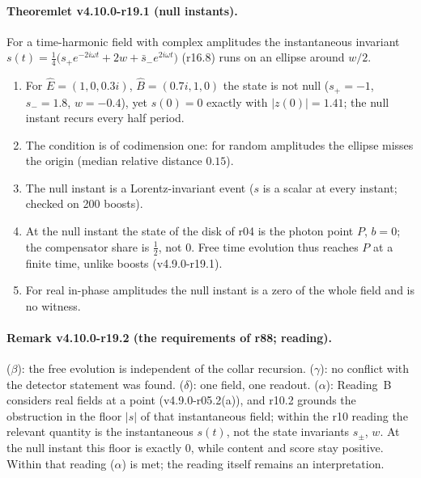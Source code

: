 \paragraph{Theoremlet v4.10.0-r19.1 (null instants).}
For a time-harmonic field with complex amplitudes the instantaneous invariant \(s(t)=\tfrac14\bigl(s_+e^{-2i\omega t}+2w+\bar s_-e^{2i\omega t}\bigr)\)
(r16.8) runs on an ellipse around \(w/2\).
\begin{enumerate}[leftmargin=2em]
\item[(a)] For \(\hat E=(1,0,0.3i)\), \(\hat B=(0.7i,1,0)\) the state is not null (\(s_+=-1\), \(s_-=1.8\), \(w=-0.4\)), yet \(s(0)=0\) exactly with
\(|z(0)|=1.41\); the null instant recurs every half period.
\item[(b)] The condition is of codimension one: for random amplitudes the ellipse misses the origin (median relative distance \(0.15\)).
\item[(c)] The null instant is a Lorentz-invariant event (\(s\) is a scalar at every instant; checked on 200 boosts).
\item[(d)] At the null instant the state of the disk of r04 is the photon point \(P\), \(b=0\); the compensator share is \(\tfrac12\), not \(0\).  Free time
evolution thus reaches \(P\) at a finite time, unlike boosts (v4.9.0-r19.1).
\item[(e)] For real in-phase amplitudes the null instant is a zero of the whole field and is no witness.
\end{enumerate}

\paragraph{Remark v4.10.0-r19.2 (the requirements of r88; reading).}
(\(\beta\)): the free evolution is independent of the collar recursion.  (\(\gamma\)): no conflict with the detector statement was found.
(\(\delta\)): one field, one readout.  (\(\alpha\)): Reading~B considers real fields at a point (v4.9.0-r05.2(a)), and r10.2 grounds the
obstruction in the floor \(|s|\) of that instantaneous field; within the r10 reading the relevant quantity is the instantaneous \(s(t)\),
not the state invariants \(s_\pm\), \(w\).  At the null instant this floor is exactly \(0\), while content and score stay positive.  Within
that reading (\(\alpha\)) is met; the reading itself remains an interpretation.

